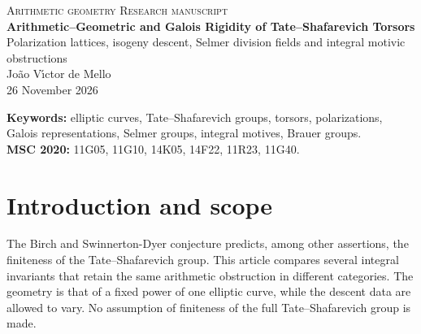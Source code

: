 \documentclass[11pt,a4paper]{article}
\theoremstyle{definition}\newtheorem{definition}[theorem]{Definition}
\theoremstyle{remark}\newtheorem{remark}[theorem]{Remark}
\newcommand{\Sha}{\operatorname{\mathrm{Sha}}}
\numberwithin{equation}{section}
\begin{document}
\thispagestyle{plain}
\begin{center}
{\small\color{teal}\textsc{Arithmetic geometry \;\textbullet\; Research manuscript}}\\[10pt]
{\LARGE\bfseries\color{navy} Arithmetic--Geometric and Galois Rigidity of Tate--Shafarevich Torsors}\\[7pt]
{\large Polarization lattices, isogeny descent, Selmer division fields and integral motivic obstructions}\\[13pt]
{\large Jo\~ao V\'{\i}ctor de Mello}\\[4pt]
26 November 2026
\end{center}
\begin{abstract}
Let $E$ be a geometrically non-CM elliptic curve over a number field $K$. For an everywhere locally soluble torsor $X$ under $E^h$, let $H$ be the finite subgroup of $\Sha(E/K)$ generated by its coordinate classes. We identify the minimum Euler characteristic of a descended ample line bundle with $\#H$ and prove that the minimum degree of a dominant morphism from $X$ to an arbitrary abelian variety of dimension $h$ lies between $(\#H)^2/C$ and $(\#H)^2$, for a constant depending only on $E,K,h$. At primes with full residual matrix algebra the comparison is exact. We compute mixed Poincar\'{e} descent defects, integral cycle-class cokernels and canonical-height energy bounds, and derive bounded-degree finiteness. In a complementary Galois-theoretic direction, we realize the dual of $H$ with coefficients in $E[p^n]$ as a relative Selmer division-field Galois group. At a large-image prime the degree of this extension agrees exactly with the minimum geometric descent degree and the square of the minimum polarization Euler characteristic. We develop the infinite-level Lie-algebraic and fine Selmer interpretations and construct locally trivial Brauer classes from compatible torsor towers. The resulting identities quantify the divisible obstruction but do not establish unrestricted finiteness of $\Sha$ or a higher Kato motivic reciprocity formula.
\end{abstract}
\noindent\textbf{Keywords:} elliptic curves, Tate--Shafarevich groups, torsors, polarizations, Galois representations, Selmer groups, integral motives, Brauer groups.\\
\textbf{MSC 2020:} 11G05, 11G10, 14K05, 14F22, 11R23, 11G40.

\section{Introduction and scope}
The Birch and Swinnerton-Dyer conjecture predicts, among other assertions, the finiteness of the Tate--Shafarevich group. This article compares several integral invariants that retain the same arithmetic obstruction in different categories. The geometry is that of a fixed power of one elliptic curve, while the descent data are allowed to vary. No assumption of finiteness of the full Tate--Shafarevich group is made.
\end{document}
